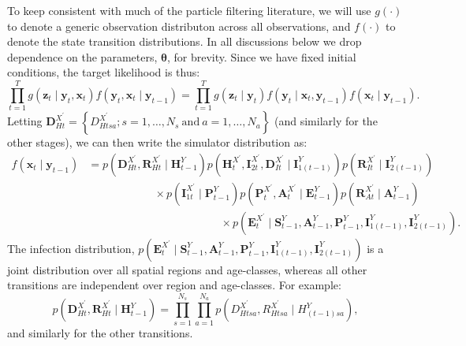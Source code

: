 \documentclass[a4paper]{article}
\newcommand{\btheta}{\bm{\theta}}
\newcommand{\bx}{\bm{x}}
\newcommand{\by}{\bm{y}}
\newcommand{\bz}{\bm{z}}
\newcommand{\bA}{\bm{A}}
\newcommand{\bD}{\bm{D}}
\newcommand{\bR}{\bm{R}}
\newcommand{\bI}{\bm{I}}
\newcommand{\bP}{\bm{P}}
\newcommand{\bE}{\bm{E}}
\newcommand{\bH}{\bm{H}}
\newcommand{\bS}{\bm{S}}
\begin{document}
To keep consistent with much of the particle filtering literature, we will use $g\left(\cdot\right)$ to denote a generic observation distributon across all observations, and $f\left(\cdot\right)$ to denote the state transition distributions. In all discussions below we drop dependence on the parameters, $\btheta$, for brevity. Since we have fixed initial conditions, the target likelihood is thus:
\begin{equation}
    \prod_{t = 1}^T g\left(\bz_{t} \mid \by_t, \bx_t\right)f\left(\by_{t}, \bx_t \mid \by_{t - 1}\right) = \prod_{t = 1}^T g\left(\bz_{t} \mid \by_t\right)f\left(\by_{t} \mid \bx_{t}, \by_{t - 1}\right)f\left(\bx_t \mid \by_{t - 1}\right).
\end{equation}
Letting $\bD^{X^\prime}_{Ht} = \left\{D^{X^\prime}_{Htsa}; s = 1, \dots, N_s~\mbox{and}~a = 1, \dots, N_a\right\}$ (and similarly for the other stages), we can then write the simulator distribution as:
\begin{align}
    f\left(\bx_t \mid \by_{t - 1}\right) &= p\left(\bD^{X^\prime}_{Ht}, \bR^{X^\prime}_{Ht} \mid \bH^{Y}_{t - 1}\right)p\left(\bH^{X^\prime}_t, \bI^{X^\prime}_{2t}, \bD^{X^\prime}_{It} \mid \bI^{Y}_{1(t - 1)}\right)p\left(\bR^{X^\prime}_{It} \mid \bI^{Y}_{2(t - 1)}\right)\nonumber\\
    & \qquad \qquad \qquad \times p\left(\bI^{X^\prime}_{1t} \mid \bP^{Y}_{t - 1}\right)p\left(\bP^{X^\prime}_t, \bA^{X^\prime}_t \mid \bE^{Y}_{t - 1}\right)p\left(\bR^{X^\prime}_{At} \mid \bA^{Y}_{t - 1} \right)\nonumber\\
    & \qquad \qquad \qquad \qquad \qquad \qquad \times p\left(\bE^{X^\prime}_t \mid \bS^{Y}_{t - 1}, \bA^{Y}_{t - 1}, \bP^{Y}_{t - 1}, \bI^{Y}_{1(t - 1)}, \bI^{Y}_{2(t - 1)}\right).\label{eq:simlike}
\end{align}
The infection distribution, $p\left(\bE^{X^\prime}_t \mid \bS^{Y}_{t - 1}, \bA^{Y}_{t - 1}, \bP^{Y}_{t - 1}, \bI^{Y}_{1(t - 1)}, \bI^{Y}_{2(t - 1)}\right)$ is a joint distribution over all spatial regions and age-classes, whereas all other transitions are independent over region and age-classes. For example:
\begin{equation}
    p\left(\bD^{X^\prime}_{Ht}, \bR^{X^\prime}_{Ht} \mid \bH^{Y}_{t - 1}\right) = \prod_{s = 1}^{N_s} \prod_{a = 1}^{N_a} p\left(D^{X^\prime}_{Htsa}, R^{X^\prime}_{Htsa} \mid H^{Y}_{(t - 1)sa}\right),
\end{equation}
and similarly for the other transitions.
\end{document}
